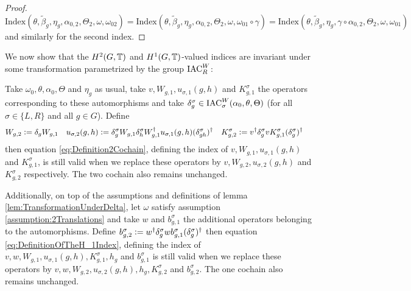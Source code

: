 \documentclass[11pt,a4paper,twoside]{article}
\numberwithin{equation}{section}
\begin{document}
\begin{proof}
		\begin{equation}
			\textrm{Index}(\theta,\tilde{\beta}_g,\eta_g,\alpha_{0,2},\Theta_2,\omega,\omega_{02})=\textrm{Index}(\theta,\tilde{\beta}_g,\eta_g,\alpha_{0,2},\Theta_2,\omega,\omega_{01}\circ\gamma)=\textrm{Index}(\theta,\tilde{\beta}_g,\eta_g,\gamma\circ\alpha_{0,2},\Theta_2,\omega,\omega_{01})
		\end{equation}
		and similarly for the second index.
	\end{proof}
	We now show that the $H^2(G,\mathbb T)$ and $H^1(G,\mathbb T)$-valued indices are invariant under some transformation parametrized by the group $\textrm{IAC}_R^W$:
	\begin{lemma}\label{lem:TransformationUnderDelta}
		Take $\omega_0,\theta,\alpha_0,\Theta$ and $\eta_g$ as usual, take $v,W_{g,1},u_{\sigma,1}(g,h)$ and $K_{g,1}^\sigma$ the operators corresponding to these automorphisms and take $\delta^\sigma_g\in\textrm{IAC}_\sigma^W(\alpha_0,\theta,\Theta)$ (for all $\sigma\in\{L,R\}$ and all $g\in G$). Define
		\begin{align}
			W_{g,2}&\vcentcolon=\delta_g W_{g,1}&
			u_{\sigma,2}(g,h)&\vcentcolon= \delta_g^\sigma W_{g,1}\delta_h^\sigma W_{g,1}^\dagger u_{\sigma,1}(g,h)(\delta_{gh}^\sigma)^\dagger&
			K^\sigma_{g,2}&\vcentcolon= v^\dagger \delta_g^\sigma v K_{g,1}^\sigma (\delta_g^\sigma)^\dagger
		\end{align}
		then equation \eqref{eq:Definition2Cochain}, defining the index of $v,W_{g,1},u_{\sigma,1}(g,h)$ and $K_{g,1}^\sigma$, is still valid when we replace these operators by $v,W_{g,2},u_{\sigma,2}(g,h)$ and $K_{g,2}^\sigma$ respectively. The two cochain also remains unchanged.
	\end{lemma}
	\begin{lemma}\label{lem:TransformationUnderDeltaTwoTranslations}
		Additionally, on top of the assumptions and definitions of lemma \ref{lem:TransformationUnderDelta}, let $\omega$ satisfy assumption \ref{assumption:2Translations} and take $w$ and $b_{g,1}^\sigma$ the additional operators belonging to the automorphisms. Define $b_{g,2}^\sigma\vcentcolon= w^\dagger\delta^\sigma_g w b_{g,1}^\sigma (\delta^\sigma_g)^\dagger$ then equation \ref{eq:DefinitionOfTheH_1Index}, defining the index of $v,w,W_{g,1},u_{\sigma,1}(g,h),K_{g,1}^\sigma,h_g$ and $b_{g,1}^\sigma$ is still valid when we replace these operators by $v,w,W_{g,2},u_{\sigma,2}(g,h),h_g,K_{g,2}^\sigma$ and $b_{g,2}^\sigma$. The one cochain also remains unchanged.
	\end{lemma}
\end{document}
